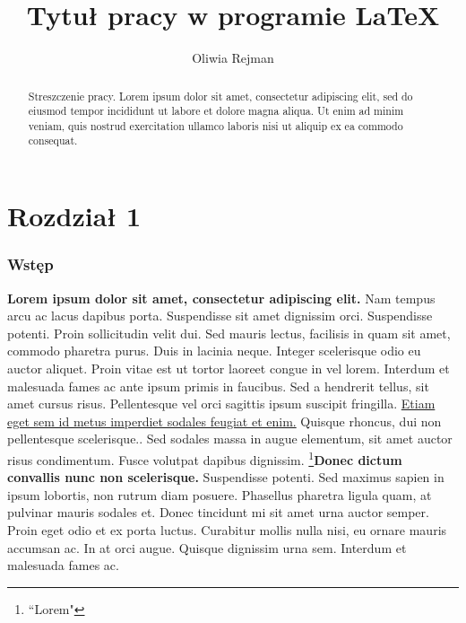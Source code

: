 \documentclass[12pt,a4paper]{article}
\title{Tytuł pracy w programie \LaTeX}
\author{Oliwia Rejman}
\begin{document}
	\maketitle
	
	\begin{abstract}
		Streszczenie pracy. Lorem ipsum dolor sit amet, consectetur adipiscing elit, sed do eiusmod tempor incididunt ut labore et dolore magna aliqua. Ut enim ad minim veniam, quis nostrud exercitation ullamco laboris nisi ut aliquip ex ea commodo consequat.
	\end{abstract}
	
	\newpage
	
	\tableofcontents
	
	\newpage
	
	\part {Rozdział 1}
	\section{Wstęp}
	\textbf{Lorem ipsum dolor sit amet, consectetur adipiscing elit.} Nam tempus arcu ac lacus dapibus porta. Suspendisse sit amet dignissim orci. Suspendisse potenti. Proin sollicitudin velit dui. Sed mauris lectus, facilisis in quam sit amet, commodo pharetra purus. Duis in lacinia neque. Integer scelerisque odio eu auctor aliquet. Proin vitae est ut tortor laoreet congue in vel lorem. Interdum et malesuada fames ac ante ipsum primis in faucibus.\cite{ref1} Sed a hendrerit tellus, sit amet cursus risus. Pellentesque vel orci sagittis ipsum suscipit fringilla. \underline{Etiam eget sem id metus imperdiet sodales feugiat et enim.} Quisque rhoncus, dui non pellentesque scelerisque.. Sed sodales massa in augue elementum, sit amet auctor risus condimentum. Fusce volutpat dapibus dignissim. \footnote{``Lorem"}\textbf{Donec dictum convallis nunc non scelerisque.} Suspendisse potenti. Sed maximus sapien in ipsum lobortis, non rutrum diam posuere. Phasellus pharetra ligula quam, at pulvinar mauris sodales et. Donec tincidunt mi sit amet urna auctor semper. Proin eget odio et ex porta luctus. Curabitur mollis nulla nisi, eu ornare mauris accumsan ac. In at orci augue. Quisque dignissim urna sem. Interdum et malesuada fames ac.
\end{document}
